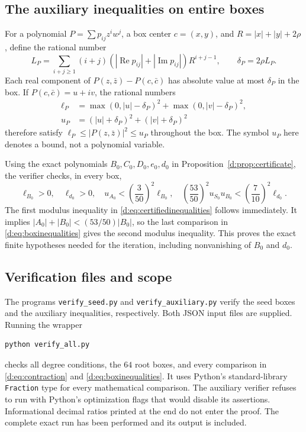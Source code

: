 \documentclass[UTF8,11pt]{ctexart}
\theoremstyle{definition}
\numberwithin{equation}{section}
\DeclareMathOperator{\Rea}{Re}\DeclareMathOperator{\Ima}{Im}
\begin{document}
\subsection{The auxiliary inequalities on entire boxes}
For a polynomial $P=\sum p_{ij}z^iw^j$, a box center $c=(x,y)$, and
$R=|x|+|y|+2\rho$, define the rational number
\[
 L_P=\sum_{i+j\ge1}(i+j)(|\Rea p_{ij}|+|\Ima p_{ij}|)R^{i+j-1},
 \qquad \delta_P=2\rho L_P.
\]
Each real component of $P(z,\bar z)-P(c,\bar c)$ has absolute value at
most $\delta_P$ in the box. If $P(c,\bar c)=u+iv$, the rational numbers
\[
 \begin{split}
 \ell_P&=\max(0,|u|-\delta_P)^2+\max(0,|v|-\delta_P)^2,\\
 u_P&=(|u|+\delta_P)^2+(|v|+\delta_P)^2
 \end{split}
\]
therefore satisfy $\ell_P\le|P(z,\bar z)|^2\le u_P$ throughout the box.
The symbol $u_P$ here denotes a bound, not a polynomial variable.

Using the exact polynomials $B_0,C_0,D_0,e_0,d_0$ in
Proposition~\ref{d:prop:certificate}, the verifier checks, in every box,
\begin{equation}\label{d:eq:boxinequalities}
 \ell_{B_0}>0,\quad \ell_{d_0}>0,\quad
 u_{A_0}<\left(\frac3{50}\right)^2\ell_{B_0},\quad
 \left(\frac{53}{50}\right)^2u_{S_0}u_{B_0}
 <\left(\frac7{10}\right)^2\ell_{d_0}.
\end{equation}
The first modulus inequality in \eqref{d:eq:certifiedinequalities} follows
immediately. It implies $|A_0|+|B_0|<(53/50)|B_0|$, so the last
comparison in \eqref{d:eq:boxinequalities} gives the second modulus
inequality. This proves the exact finite hypotheses needed for the
iteration, including nonvanishing of $B_0$ and $d_0$.

\subsection{Verification files and scope}
The programs \nolinkurl{verify_seed.py} and
\nolinkurl{verify_auxiliary.py} verify the seed boxes and the auxiliary
inequalities, respectively. Both JSON input files are supplied.
Running the wrapper
\begin{verbatim}
python verify_all.py
\end{verbatim}
checks all degree conditions, the $64$ root boxes, and every comparison
in \eqref{d:eq:contraction} and \eqref{d:eq:boxinequalities}. It uses Python's
standard-library \texttt{Fraction} type for every mathematical comparison.
The auxiliary verifier refuses to run with Python's optimization flags
that would disable its assertions. Informational decimal ratios printed
at the end do not enter the proof. The complete exact run has been
performed and its output is included.
\end{document}
